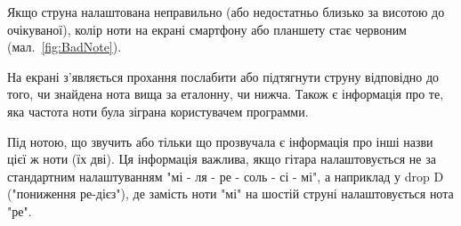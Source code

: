 Якщо струна налаштована неправильно (або недостатньо близько за висотою до очікуваної), колір ноти на екрані смартфону або планшету стає червоним (мал.~\ref{fig:BadNote}).

На екрані з'являється прохання послабити або підтягнути струну відповідно до того, чи знайдена нота вища за еталонну, чи нижча. Також є інформація про те, яка частота ноти була зіграна користувачем программи.

Під нотою, що звучить або тільки що прозвучала є інформація про інші назви цієї ж ноти (їх дві). Ця інформація важлива, якщо гітара налаштовується не за стандартним налаштуванням "мі - ля - ре - соль - сі - мі", а наприклад у drop D ("пониження ре-дієз"), де замість ноти "мі" на шостій струні налаштовується нота "ре".